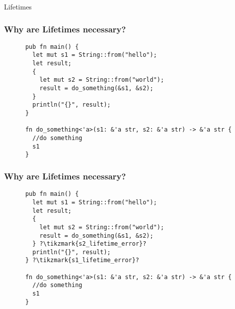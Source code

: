 \begin{section}{Lifetimes}
    \begin{frame}[fragile]
    \frametitle{Why are Lifetimes necessary? \cite{RustLang}}
    \begin{verbatim}
      pub fn main() {
        let mut s1 = String::from("hello");
        let result;
        {
          let mut s2 = String::from("world");
          result = do_something(&s1, &s2);
        }
        println("{}", result);
      }

      fn do_something<'a>(s1: &'a str, s2: &'a str) -> &'a str {
        //do something
        s1
      }
    \end{verbatim}
  \end{frame}

  \begin{frame}[fragile]
    \frametitle{Why are Lifetimes necessary?}
    \begin{verbatim}
      pub fn main() {
        let mut s1 = String::from("hello");
        let result;
        {
          let mut s2 = String::from("world");
          result = do_something(&s1, &s2);
        } ?\tikzmark{s2_lifetime_error}?
        println("{}", result);
      } ?\tikzmark{s1_lifetime_error}?

      fn do_something<'a>(s1: &'a str, s2: &'a str) -> &'a str {
        //do something
        s1
      }
    \end{verbatim}
  \end{frame}

\end{section}
